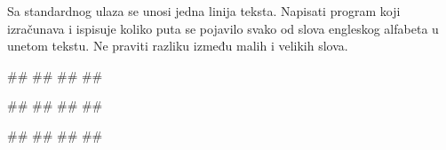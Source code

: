 \begin{Exercise}[label=vp.bez_resenja_3] 
Sa standardnog ulaza se unosi jedna linija teksta. Napisati program koji izračunava i ispisuje koliko puta se pojavilo svako od slova engleskog alfabeta u unetom tekstu. Ne praviti razliku između malih i velikih slova. 


\begin{maxitest}
\begin{upotreba}{1}
#\naslovInt#
##
##
##
\end{upotreba}
\end{maxitest}

\begin{maxitest}
\begin{upotreba}{2}
#\naslovInt#
##
##
##
\end{upotreba}
\end{maxitest}

\begin{maxitest}
\begin{upotreba}{3}
#\naslovInt#
##
##
##
\end{upotreba}
\end{maxitest}
\end{Exercise}

\ifresenja
\begin{Answer}[ref=vp.bez_resenja_3]
\end{Answer}
\fi

